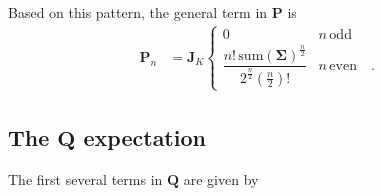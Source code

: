 \documentclass[modern]{aastex62}
\begin{document}
%
Based on this pattern, the general term in $\mathbf{P}$ is
%
\begin{align}
    \mathbf{P}_n & =
    \mathbf{J}_K
    \begin{cases}
        0                                                                                             & n \, \mathrm{odd}
        \\
        \dfrac{n! \, \mathrm{sum}(\pmb{\Sigma})^\frac{n}{2}}{2^\frac{n}{2} \left(\frac{n}{2}\right)!} & n \, \mathrm{even}
        \quad.
    \end{cases}
\end{align}

\subsection{The $\mathbf{Q}$ expectation}
%
The first several terms in $\mathbf{Q}$ are given by
%
\setlength{\abovedisplayskip}{1em}
\end{document}

